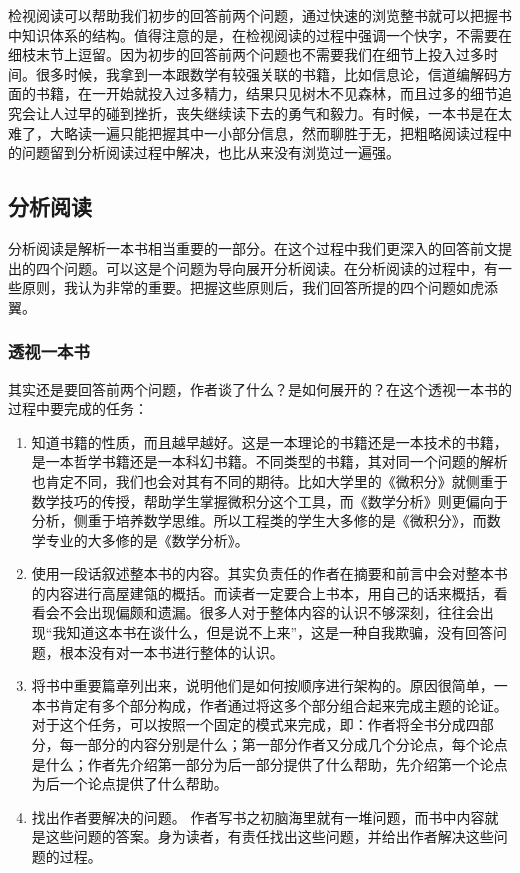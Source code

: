 \documentclass[10pt,a4paper,UTF8]{article}
\begin{document}
检视阅读可以帮助我们初步的回答前两个问题，通过快速的浏览整书就可以把握书中知识体系的结构。值得注意的是，在检视阅读的过程中强调一个快字，不需要在细枝末节上逗留。因为初步的回答前两个问题也不需要我们在细节上投入过多时间。很多时候，我拿到一本跟数学有较强关联的书籍，比如信息论，信道编解码方面的书籍，在一开始就投入过多精力，结果只见树木不见森林，而且过多的细节追究会让人过早的碰到挫折，丧失继续读下去的勇气和毅力。有时候，一本书是在太难了，大略读一遍只能把握其中一小部分信息，然而聊胜于无，把粗略阅读过程中的问题留到分析阅读过程中解决，也比从来没有浏览过一遍强。

\subsection{分析阅读}
\label{sec:orgheadline7}


分析阅读是解析一本书相当重要的一部分。在这个过程中我们更深入的回答前文提出的四个问题。可以这是个问题为导向展开分析阅读。在分析阅读的过程中，有一些原则，我认为非常的重要。把握这些原则后，我们回答所提的四个问题如虎添翼。
\subsubsection{透视一本书}
\label{sec:orgheadline4}


其实还是要回答前两个问题，作者谈了什么？是如何展开的？在这个透视一本书的过程中要完成的任务：

\begin{enumerate}
\item 知道书籍的性质，而且越早越好。这是一本理论的书籍还是一本技术的书籍，是一本哲学书籍还是一本科幻书籍。不同类型的书籍，其对同一个问题的解析也肯定不同，我们也会对其有不同的期待。比如大学里的《微积分》就侧重于数学技巧的传授，帮助学生掌握微积分这个工具，而《数学分析》则更偏向于分析，侧重于培养数学思维。所以工程类的学生大多修的是《微积分》，而数学专业的大多修的是《数学分析》。

\item 使用一段话叙述整本书的内容。其实负责任的作者在摘要和前言中会对整本书的内容进行高屋建瓴的概括。而读者一定要合上书本，用自己的话来概括，看看会不会出现偏颇和遗漏。很多人对于整体内容的认识不够深刻，往往会出现“我知道这本书在谈什么，但是说不上来”，这是一种自我欺骗，没有回答问题，根本没有对一本书进行整体的认识。

\item 将书中重要篇章列出来，说明他们是如何按顺序进行架构的。原因很简单，一本书肯定有多个部分构成，作者通过将这多个部分组合起来完成主题的论证。对于这个任务，可以按照一个固定的模式来完成，即：作者将全书分成四部分，每一部分的内容分别是什么；第一部分作者又分成几个分论点，每个论点是什么；作者先介绍第一部分为后一部分提供了什么帮助，先介绍第一个论点为后一个论点提供了什么帮助。

\item 找出作者要解决的问题。 作者写书之初脑海里就有一堆问题，而书中内容就是这些问题的答案。身为读者，有责任找出这些问题，并给出作者解决这些问题的过程。
\end{enumerate}
\end{document}

